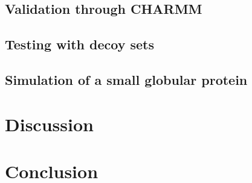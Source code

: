 \documentclass[11pt,titlepage]{article}
\begin{document}
\subsection{Validation through CHARMM}

\subsection{Testing with decoy sets}

\subsection{Simulation of a small globular protein}

\section{Discussion}

\section{Conclusion}


{\footnotesize }
\end{document}
